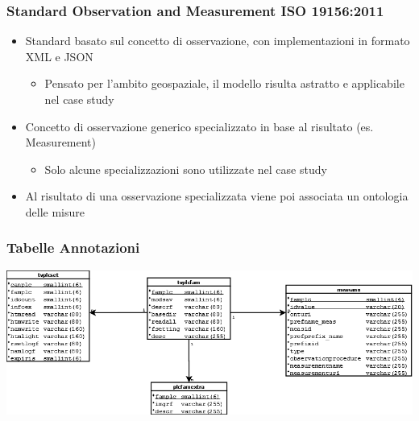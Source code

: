 \documentclass{beamer}
\begin{document}
\begin{frame}
\frametitle{Standard Observation and Measurement ISO 19156:2011}
\begin{itemize}
\item Standard basato sul concetto di osservazione, con implementazioni in formato XML e JSON
\begin{itemize}
\item Pensato per l'ambito geospaziale, il modello risulta astratto e applicabile nel case study
\end{itemize}
\item Concetto di osservazione generico specializzato in base al risultato (es. Measurement)
\begin{itemize}
\item Solo alcune specializzazioni sono utilizzate nel case study
\end{itemize}
\item Al risultato di una osservazione specializzata viene poi associata un ontologia delle misure
\end{itemize}	
\end{frame}

\begin{frame}
\frametitle{Tabelle Annotazioni}
\includegraphics[width=1\textwidth]{images/AltreTabelleAnnotazioniMOD4.png}
\end{frame}



\end{document}

